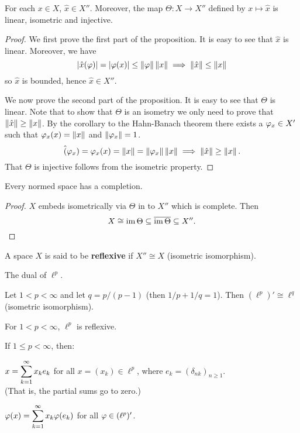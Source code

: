 \begin{prop}
  For each $x \in X$, $\hat x \in X''$.
  Moreover, the map $\Theta: X \to X''$ defined by $x \mapsto \hat x$ is linear, isometric and injective.
\end{prop}

\begin{proof}
  We first prove the first part of the proposition.
  It is easy to see that $\hat x$ is linear.
  Moreover, we have
  \[\left\lvert \hat x(\varphi) \right\rvert = \left\lvert \varphi(x) \right\rvert \leq \left\lVert \varphi \right\rVert \left\lVert x \right\rVert \implies \left\lVert \hat x \right\rVert \leq \left\lVert x \right\rVert\]
  so $\hat x$ is bounded, hence $\hat x \in X''$.

  We now prove the second part of the proposition.
  It is easy to see that $\Theta$ is linear.
  Note that to show that $\Theta$ is an isometry we only need to prove that $\left\lVert \hat x \right\rVert \geq \left\lVert x \right\rVert$.
  By the corollary to the Hahn-Banach theorem there exists a $\varphi_x \in X'$ such that $\varphi_x(x) = \left\lVert x \right\rVert$ and $\left\lVert \varphi_x \right\rVert=1$.
  \[\hat(\varphi_x) = \varphi_x(x) = \left\lVert x \right\rVert = \left\lVert \varphi_x \right\rVert\left\lVert x \right\rVert \implies \left\lVert \hat x \right\rVert \geq \left\lVert x \right\rVert.\]
  That $\Theta$ is injective follows from the isometric property.
\end{proof}

\begin{cor}
  Every normed space has a completion.
\end{cor}

\begin{proof}
  $X$ embeds isometrically via $\Theta$ in to $X''$ which is complete.
  Then
  \[X \cong \operatorname{im}\Theta \subseteq \overline{\operatorname{im}\Theta} \subseteq X''.\]
\end{proof}

\begin{defn}
  A space $X$ is said to be \textbf{reflexive} if $X'' \cong X$ (isometric isomorphism).
\end{defn}

The dual of $\ell^p$.

\begin{thm}
  Let $1<p<\infty$ and let $q = p/(p-1)$ (then $1/p+1/q=1$).
  Then $(\ell^p)' \cong \ell^q$ (isometric isomorphism).
\end{thm}

\begin{cor}
  For $1<p<\infty$, $\ell^p$ is reflexive.
\end{cor}

\begin{lem}
  If $1\leq p<\infty$, then:
  \begin{enum}
    \io
    $\displaystyle x = \sum_{k=1}^\infty x_ke_k$ for all $x = (x_k) \in \ell^p$, where $e_k = (\delta_{nk})_{n \geq 1}$.\\
  (That is, the partial sums go to zero.)

  \io
  $\displaystyle \varphi(x) = \sum_{k=1}^\infty x_k\varphi(e_k)$ for all $\varphi \in (\ell^p)'$.
  \end{enum}
\end{lem} 


